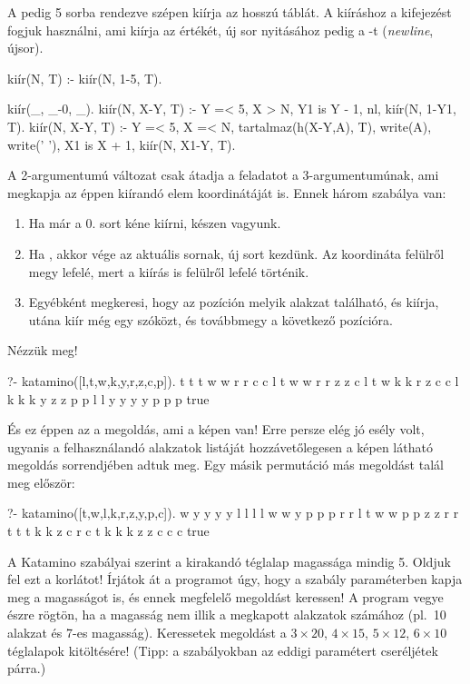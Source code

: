 A  pedig 5 sorba rendezve szépen
kiírja az  hosszú  táblát. A kiíráshoz a
 kifejezést fogjuk használni, ami
kiírja az  értékét, új sor nyitásához pedig a
-t (\emph{newline}, újsor).
\begin{program}
kiír(N, T) :- kiír(N, 1-5, T).

kiír(_, _-0, _).
kiír(N, X-Y, T) :-
    Y =< 5, X > N, Y1 is Y - 1,
    nl, kiír(N, 1-Y1, T).
kiír(N, X-Y, T) :-
    Y =< 5, X =< N,
    tartalmaz(h(X-Y,A), T),
    write(A), write(' '),
    X1 is X + 1,
    kiír(N, X1-Y, T).
\end{program}
A 2-argumentumú változat csak átadja a feladatot a
3-argumentumúnak, ami megkapja az éppen kiírandó
elem  koordinátáját is. Ennek három szabálya
van:
\begin{enumerate}
\item Ha már a 0. sort kéne kiírni, készen vagyunk.
\item Ha , akkor vége az aktuális sornak,
  új sort kezdünk. Az  koordináta felülről
  megy lefelé, mert a kiírás is felülről lefelé
  történik.
\item Egyébként megkeresi, hogy az  pozíción
  melyik alakzat található, és kiírja, utána kiír
  még egy szóközt, és továbbmegy a következő 
  pozícióra.
\end{enumerate}
Nézzük meg!
\begin{query}
?- katamino([l,t,w,k,y,r,z,c,p]).
t t t w w r r c c 
l t w w r r z z c 
l t w k k r z c c 
l k k k y z z p p 
l l y y y y p p p 
true
\end{query}
És ez éppen az a megoldás, ami a képen van! Erre
persze elég jó esély volt, ugyanis a felhasználandó
alakzatok listáját hozzávetőlegesen a képen látható
megoldás sorrendjében adtuk meg. Egy másik
permutáció más megoldást talál meg először:
\begin{query}
?- katamino([t,w,l,k,r,z,y,p,c]).
w y y y y l l l l 
w w y p p p r r l 
t w w p p z z r r 
t t t k k z c r c 
t k k k z z c c c 
true 
\end{query}

\begin{problem}
A Katamino szabályai szerint a kirakandó téglalap
magassága mindig 5. Oldjuk fel ezt a korlátot!
Írjátok át a programot úgy, hogy a 
szabály paraméterben kapja meg a magasságot is, és
ennek megfelelő megoldást keressen! A program vegye
észre rögtön, ha a magasság nem illik a megkapott
alakzatok számához (pl.~10 alakzat és 7-es
magasság). Keressetek megoldást a $3\times20$,
$4\times15$, $5\times12$, $6\times10$ téglalapok
kitöltésére! (Tipp: a szabályokban az eddigi 
paramétert cseréljétek  párra.)
\end{problem}

